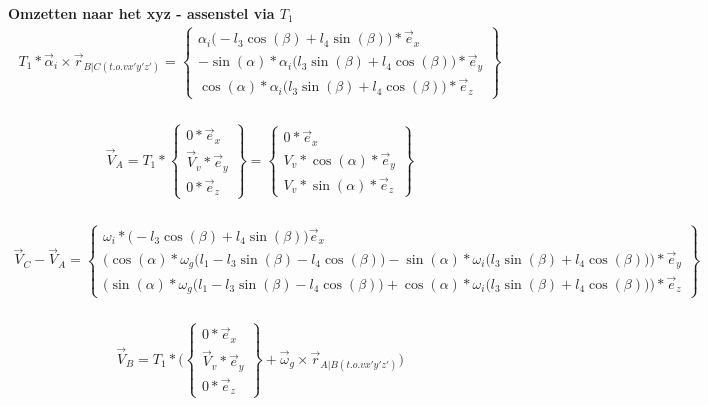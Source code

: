 \documentclass[a4paper,10pt]{article}
\begin{document}
\textbf{Omzetten naar het xyz - assenstel via $T_1$}
\begin{equation}
\begin{aligned}
{T}_{1}*\vec{\alpha}_i \times \vec{r}_{B|C(t.o.v x'y'z')} = \begin{Bmatrix}
{\alpha_i \Big(- l_3 \cos(\beta) + l_4 \sin(\beta)\Big)*\vec{e}_{x}}\\
-\sin(\alpha)*	\alpha_i \Big(l_3 \sin(\beta) + l_4 \cos(\beta)\Big)*\vec{e}_{y}\\
\cos(\alpha)*\alpha_i \Big(l_3 \sin(\beta) + l_4 \cos(\beta)\Big)*\vec{e}_{z}
\end{Bmatrix}
\end{aligned}
\end{equation}\\
\begin{equation}
\begin{aligned}
\vec{V}_A = {T}_{1}* \begin{Bmatrix}
{0*\vec{e}_{x}}\\
\vec{V}_v*\vec{e}_{y}\\
0*\vec{e}_{z}
\end{Bmatrix} = \begin{Bmatrix}
{0*\vec{e}_{x}}\\
V_v*\cos(\alpha)*\vec{e}_{y}\\
V_v*\sin(\alpha)*\vec{e}_{z}
\end{Bmatrix}
\end{aligned}
\end{equation}\\
\begin{equation}
\begin{aligned}
\vec{V}_C -\vec{V}_A = \begin{Bmatrix}
{\omega_i*\Big( - l_3 \cos(\beta) + l_4 \sin(\beta)\Big)\vec{e}_{x}}\\
\Big(\cos(\alpha)*\omega_g \Big(l_1 - l_3 \sin(\beta) - l_4 \cos(\beta)\Big) -\sin(\alpha)*	\omega_i \Big(l_3 \sin(\beta) + l_4 \cos(\beta)\Big)\Big)*\vec{e}_{y}\\
\Big(\sin(\alpha)*\omega_g \Big(l_1 - l_3 \sin(\beta) - l_4 \cos(\beta)\Big) +\cos(\alpha)*	\omega_i \Big(l_3 \sin(\beta) + l_4 \cos(\beta)\Big)\Big)*\vec{e}_{z}
\end{Bmatrix} 
\end{aligned}
\end{equation}\\
\begin{equation}
\begin{aligned}
\vec{V}_B = {T}_{1}* \Big(\begin{Bmatrix}
{0*\vec{e}_{x}}\\
\vec{V}_v*\vec{e}_{y}\\
0*\vec{e}_{z} 
\end{Bmatrix} + \vec{\omega}_g \times \vec{r}_{A|B(t.o.v x'y'z')}\Big)
\end{aligned}
\end{equation}\\
\end{document}
